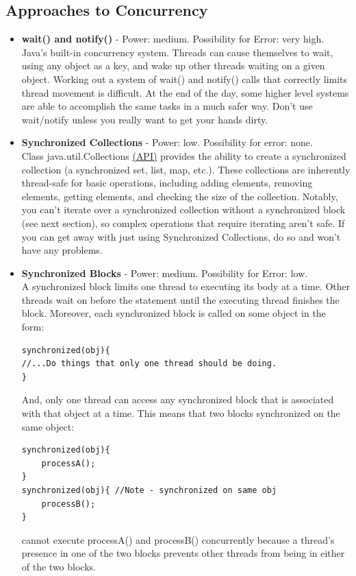 \documentclass[11pt]{article}
\begin{document}
\subsection{Approaches to Concurrency}
\begin{itemize}
\item \textbf{wait() and notify()} - Power: medium. Possibility for Error: very high.\\
Java's built-in concurrency system. Threads can cause themselves to wait, using any object as a key, and wake up other threads waiting on a given object. Working out a system of wait() and notify() calls that correctly limits thread movement is difficult. At the end of the day, some higher level systems are able to accomplish the same tasks in a much safer way. Don't use wait/notify unless you really want to get your hands dirty.
\item \textbf{Synchronized Collections} - Power: low. Possibility for error: none. \\
Class java.util.Collections \href{http://docs.oracle.com/javase/7/docs/api/java/util/Collections.html\#synchronizedCollection(java.util.Collection)}{({\color{blue}\underline{API}})} provides the ability to create a synchronized collection (a synchronized set, list, map, etc.). These collections are inherently thread-safe for basic operations, including adding elements, removing elements, getting elements, and checking the size of the collection. Notably, you can't iterate over a synchronized collection without a synchronized block (see next section), so complex operations that require iterating aren't safe. If you can get away with just using Synchronized Collections, do so and won't have any problems.
\item \textbf{Synchronized Blocks} - Power: medium. Possibility for Error: low.\\
A synchronized block limits one thread to executing its body at a time. Other threads wait on before the statement until the executing thread finishes the block. Moreover, each synchronized block is called on some object in the form:\\

\begin{lstlisting}[frame=single]
synchronized(obj){
//...Do things that only one thread should be doing.
}
\end{lstlisting}
And, only one thread can access any synchronized block that is associated with that object at a time. This means that two blocks synchronized on the same object:\\
\begin{lstlisting}[frame=single]
synchronized(obj){
    processA();
}
synchronized(obj){ //Note - synchronized on same obj
    processB();
}
\end{lstlisting}
cannot execute processA() and processB() concurrently because a thread's presence in one of the two blocks prevents other threads from being in either of the two blocks.


\end{itemize}
\end{document}
